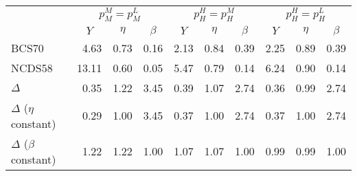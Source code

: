 
\begin{tabular}{lrrrrrrrrr}
\toprule
\multicolumn{1}{c}{} & \multicolumn{3}{c}{$p_{M}^{M}=p_{M}^{L}$} & \multicolumn{3}{c}{$p_{H}^{H}=p_{H}^{M}$} & \multicolumn{3}{c}{$p_{H}^{H}=p_{H}^{L}$} \\
\cmidrule(l{3pt}r{3pt}){2-4} \cmidrule(l{3pt}r{3pt}){5-7} \cmidrule(l{3pt}r{3pt}){8-10}
  & \multicolumn{1}{c}{$Y$} & \multicolumn{1}{c}{$\eta$} & \multicolumn{1}{c}{$\beta$} & \multicolumn{1}{c}{$Y$} & \multicolumn{1}{c}{$\eta$} & \multicolumn{1}{c}{$\beta$} & \multicolumn{1}{c}{$Y$} & \multicolumn{1}{c}{$\eta$} & \multicolumn{1}{c}{$\beta$}\\
\midrule
BCS70 & 4.63 & 0.73 & 0.16 & 2.13 & 0.84 & 0.39 & 2.25 & 0.89 & 0.39\\
NCDS58 & 13.11 & 0.60 & 0.05 & 5.47 & 0.79 & 0.14 & 6.24 & 0.90 & 0.14\\
\midrule
$\Delta$ & 0.35 & 1.22 & 3.45 & 0.39 & 1.07 & 2.74 & 0.36 & 0.99 & 2.74\\
\midrule
$\Delta$ ($\eta$ constant) & 0.29 & 1.00 & 3.45 & 0.37 & 1.00 & 2.74 & 0.37 & 1.00 & 2.74\\
$\Delta$ ($\beta$ constant) & 1.22 & 1.22 & 1.00 & 1.07 & 1.07 & 1.00 & 0.99 & 0.99 & 1.00\\
\bottomrule
\end{tabular}

